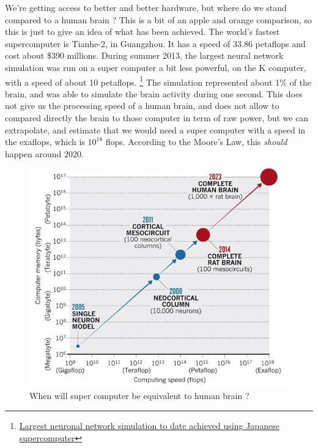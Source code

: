 \documentclass[12pt]{article}
\begin{document}
We're getting access to better and better hardware, but where do we stand
compared to a human brain ? This is a bit of an apple and orange comparison, so
this is just to give an idea of what has been achieved. The world's fastest
supercomputer is Tianhe-2, in Guangzhou. It has a speed of 33.86 \gls{petaflops}
and cost about \$390 millions. During summer 2013, the largest neural network
simulation was run on a super computer a bit less powerful, on the K computer,
with a speed of about 10 petaflops.
\footnote{\href{http://www.sciencedaily.com/releases/2013/08/130802080237.htm}
{Largest neuronal network simulation to date achieved using Japanese
supercomputer}} The simulation represented about 1\% of the brain, and was able
to simulate the brain activity during one second. This does not give us the
processing speed of a human brain, and does not allow to compared directly the
brain to those computer in term of raw power, but we can extrapolate, and
estimate that we would need a super computer with a speed in the exaflops, which
is $10^{18}$ flops. According to the Moore's Law, this {\em should} happen around
2020.

\begin{figure}[ht]
    \centering
    \includegraphics[width=\textwidth]{fartogo}
    \caption{When will super computer be equivalent to human brain ?}
    \label{fig:fartogo}
\end{figure}

\end{document}
